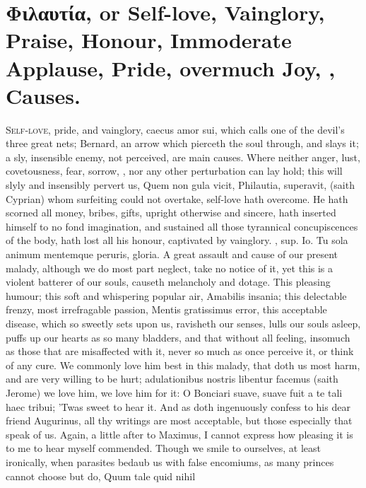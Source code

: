 {{\section[\textgreek{Φιλαυτία}, or Self-love]{\textgreek{Φιλαυτία}, or Self-love, Vainglory, Praise, Honour, Immoderate Applause, Pride, overmuch Joy, \etc{}, Causes.}
\lettrine{S}{elf-love}, pride, and vainglory, caecus amor sui, which
\Chrysostom{} calls one of the devil's three great nets; Bernard, an
arrow which pierceth the soul through, and slays it; a sly, insensible
enemy, not perceived, are main causes. Where neither anger, lust,
covetousness, fear, sorrow, \etc{}, nor any other perturbation can lay
hold; this will slyly and insensibly pervert us, Quem non gula vicit,
Philautia, superavit, (saith Cyprian) whom surfeiting could not
overtake, self-love hath overcome. He hath scorned all money,
bribes, gifts, upright otherwise and sincere, hath inserted himself to
no fond imagination, and sustained all those tyrannical concupiscences
of the body, hath lost all his honour, captivated by vainglory.
\Chrysostom{}, sup. Io. Tu sola animum mentemque peruris, gloria. A great
assault and cause of our present malady, although we do most part
neglect, take no notice of it, yet this is a violent batterer of our
souls, causeth melancholy and dotage. This pleasing humour; this soft
and whispering popular air, Amabilis insania; this delectable frenzy,
most irrefragable passion, Mentis gratissimus error, this acceptable
disease, which so sweetly sets upon us, ravisheth our senses, lulls our
souls asleep, puffs up our hearts as so many bladders, and that without
all feeling, insomuch as those that are misaffected with it,
never so much as once perceive it, or think of any cure. We commonly
love him best in this malady, that doth us most harm, and are
very willing to be hurt; adulationibus nostris libentur facemus (saith
 Jerome) we love him, we love him for it: O Bonciari suave,
suave fuit a te tali haec tribui; 'Twas sweet to hear it. And as
\Pliny{} doth ingenuously confess to his dear friend Augurinus, all
thy writings are most acceptable, but those especially that speak of
us. Again, a little after to Maximus, I cannot express how
pleasing it is to me to hear myself commended. Though we smile to
ourselves, at least ironically, when parasites bedaub us with false
encomiums, as many princes cannot choose but do, Quum tale quid nihil
}}
